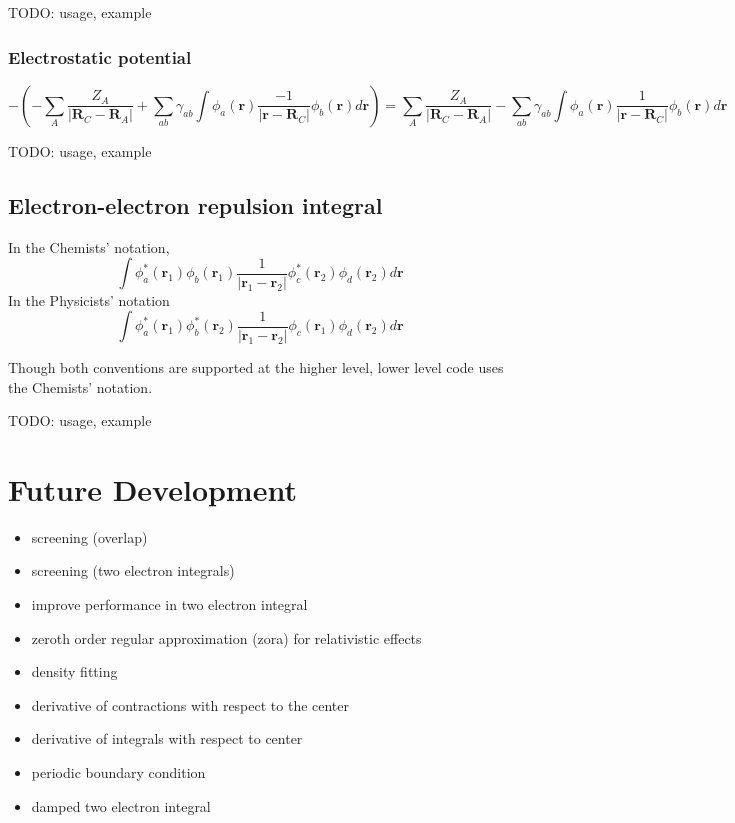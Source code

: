 \documentclass[letterpaper]{article}
\begin{document}
TODO: usage, example
\subsubsection{Electrostatic potential}
\begin{equation}
  \label{eq:nuclear_electron_attraction}
  - \left(
    - \sum_A \frac{Z_A}{|\mathbf{R}_C - \mathbf{R}_A|}
    + \sum_{ab} \gamma_{ab} \int \phi_a(\mathbf{r}) \frac{-1}{|\mathbf{r} - \mathbf{R}_C|} \phi_b(\mathbf{r}) d\mathbf{r}
  \right)
  =
  \sum_A \frac{Z_A}{|\mathbf{R}_C - \mathbf{R}_A|}
  - \sum_{ab} \gamma_{ab} \int \phi_a(\mathbf{r}) \frac{1}{|\mathbf{r} - \mathbf{R}_C|} \phi_b(\mathbf{r}) d\mathbf{r}
\end{equation}

TODO: usage, example
\subsection{Electron-electron repulsion integral}
In the Chemists' notation,
\begin{equation}
  \label{eq:elec_repulsion}
  \int \phi^*_a(\mathbf{r}_1) \phi_b(\mathbf{r}_1)
  \frac{1}{|\mathbf{r}_1 - \mathbf{r}_2|}
  \phi^*_c(\mathbf{r}_2) \phi_d(\mathbf{r}_2) d\mathbf{r}
\end{equation}
In the Physicists' notation
\begin{equation}
  \label{eq:elec_repulsion_phys}
  \int \phi^*_a(\mathbf{r}_1) \phi^*_b(\mathbf{r}_2)
  \frac{1}{|\mathbf{r}_1 - \mathbf{r}_2|}
  \phi_c(\mathbf{r}_1) \phi_d(\mathbf{r}_2) d\mathbf{r}
\end{equation}

Though both conventions are supported at the higher level, lower level code uses
the Chemists' notation.

TODO: usage, example

\section{Future Development}
\begin{itemize}
\item screening (overlap)
\item screening (two electron integrals)
\item improve performance in two electron integral
\item zeroth order regular approximation (zora) for relativistic effects
\item density fitting
\item derivative of contractions with respect to the center
\item derivative of integrals with respect to center
\item periodic boundary condition
\item damped two electron integral
\end{itemize}
\end{document}
